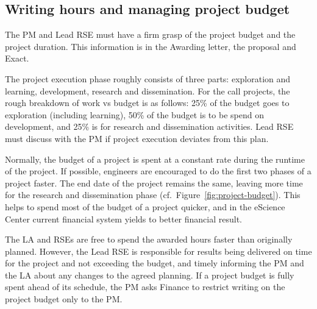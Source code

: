 \subsection{Writing hours and managing project budget}
\label{sec:exec:budget}
The PM and Lead RSE must have a firm grasp of the project budget and the project duration. This information is in the
Awarding letter, the proposal and Exact.

The project execution phase roughly consists of three parts: exploration and learning, development, research and dissemination.
For the call projects, the rough breakdown of work vs budget is as follows: 25\% of the budget goes to
exploration (including learning), 50\% of the budget is to be spend on development, and 25\% is for research
and dissemination activities. Lead RSE must discuss with the PM if project execution deviates from this plan.

Normally, the budget of a project is spent at a constant rate during the runtime of the project. 
If possible, engineers are encouraged to do the first two phases of a project faster. The end date of the project 
remains the same, leaving more time for the research and dissemination phase (cf.~Figure~\ref{fig:project-budget}). 
This helps to spend most of the budget of a project quicker, and in the eScience Center current financial system yields 
to better financial result.

The LA and RSEs are free to spend the awarded hours faster than originally planned. However, the Lead RSE is responsible 
for results being delivered on time for the project and not exceeding the budget, and timely informing the PM and the LA 
about any changes to the agreed planning. If a project budget is fully spent ahead of its schedule, the PM asks Finance to restrict writing on the
project budget only to the PM.

